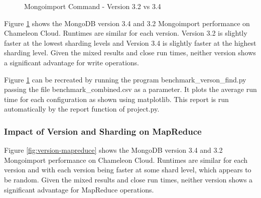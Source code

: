 \documentclass[sigconf]{acmart}
\begin{document}
\begin{figure}[htbp]
\centering
{}
\caption{Mongoimport Command - Version 3.2 vs 3.4}
\label{fig:version-import}
\end{figure}


Figure \ref{fig:version-import} shows the MongoDB version 3.4 and 3.2 Mongoimport performance on Chameleon Cloud. Runtimes are similar for each version.  Version 3.2 is slightly faster at the lowest sharding levels and Version 3.4 is slightly faster at the highest sharding level.  Given the mixed results and close run times, neither version shows a significant advantage for write operations.

Figure \ref{fig:version-import} can be recreated by running the program benchmark\_verson\_find.py passing the file benchmark\_combined.csv as a parameter.  It plots the average run time for each configuration as shown using matplotlib.  This report is run automatically by the report function of project.py.



\subsubsection{Impact of Version and Sharding on MapReduce}

Figure \ref{fig:version-mapreduce} shows the MongoDB version 3.4 and 3.2 Mongoimport performance on Chameleon Cloud.  Runtimes are similar for each version and with each version being faster at some shard level, which appears to be random. Given the mixed results and close run times, neither version shows a significant advantage for MapReduce operations.
\end{document}
